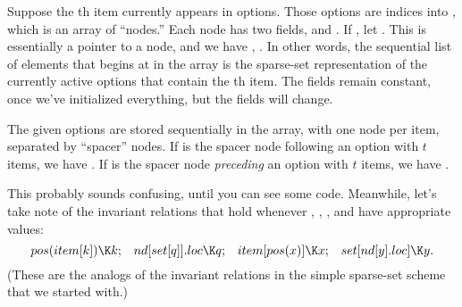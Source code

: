 Suppose the th item  currently appears in  options.
Those options
are indices into , which is an array of ``nodes.'' Each node
has two fields,  and . If , let %
.
This is essentially a pointer to a node, and we have
, . In other
words,
the sequential list of  elements that begins at
 in the  array is the sparse-set
representation of the
currently active options that contain the th item.
The  fields remain constant,
once we've initialized everything, but the  fields will change.

The given options are stored sequentially in the  array, with one
node
per item, separated by ``spacer'' nodes. If  is the spacer node
following an option with $t$ items, we have .
If  is the spacer node {\it preceding\/} an option with $t$ items,
we have .

This probably sounds confusing, until you can see some code.
Meanwhile, let's take note of the invariant relations that hold
whenever , , , and  have appropriate values:
$$\hbox{\PB{$\\{pos}(\\{item}[\|k])\K\|k$};\quad
\PB{$\\{nd}[\\{set}[\|q]].\\{loc}\K\|q$};\quad
\PB{$\\{item}[\\{pos}(\|x)]\K\|x$};\quad
\PB{$\\{set}[\\{nd}[\|y].\\{loc}]\K\|y$}.}$$
(These are the analogs of the invariant relations  in
the simple sparse-set scheme that we started with.)

